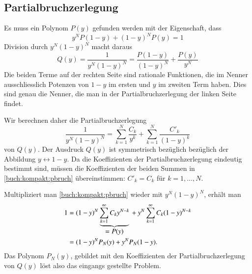 %
%
%

%
%
\subsection{Partialbruchzerlegung}
Es muss ein Polynom $P(y)$ gefunden werden mit der Eigenschaft, dass
\begin{equation}
y^N P(1-y) + (1-y)^N P(y) = 1
\label{buch:kompakt:bedingung}
\end{equation}
Division durch $y^N(1-y)^N$ macht daraus
\[
Q(y)
=
\frac{1}{y^N(1-y)^N}
=
\frac{P(1-y)}{(1-y)^N}
+
\frac{P(y)}{y^N}
\]
Die beiden Terme auf der rechten Seite sind rationale Funktionen, die im
Nenner ausschliesslich Potenzen von $1-y$ im ersten und $y$ im zweiten
Term haben.
Dies sind genau die Nenner, die man in der Partialbruchzerlegung der linken
Seite findet.

Wir berechnen daher die Partialbruchzerlegung
\begin{equation}
\frac{1}{y^N(1-y)^N}
=
\sum_{k=1}^N\frac{C_k}{y^k}
+
\sum_{k=1}^N\frac{C'_k}{(1-y)^k}
\label{buch:kompakt:pbruch}
\end{equation}
von $Q(y)$.
Der Ausdruck $Q(y)$ ist symmetrisch bezüglich bezüglich der Abbildung
$y\leftrightarrow 1-y$.
Da die Koeffizienten der Partialbruchzerlegung eindeutig bestimmt sind,
müssen die Koeffizienten der beiden Summen in \eqref{buch:kompakt:pbruch}
übereinstimmen: $C'_k=C_k$ für $k=1,\dots,N$.

Multipliziert man \eqref{buch:kompakt:pbruch} wieder mit $y^N(1-y)^N$,
erhält man
\begin{align*}
1
&=
(1-y)^N
\underbrace{\sum_{k=1}^\infty C_k y^{N-k}}_{\displaystyle =P(y)}
\mathstrut
+
y^N
\sum_{k=1}^\infty C_k (1-y)^{N-k}
\\
&=
(1-y)^N
P_N(y)
+
y^N
P_N(1-y).
\end{align*}
Das Polynom $P_N(y)$, gebildet mit den Koeffizienten der Partialbruchzerlegung
von $Q(y)$ löst also das eingangs gestellte Problem.

